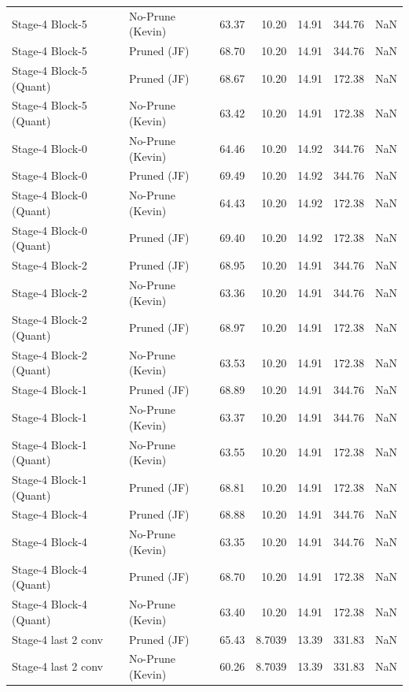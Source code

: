 \begin{table}
\begin{tabular}{llrrrrl}
Stage-4 Block-5 & No-Prune (Kevin) & 63.37 & 10.20 & 14.91 & 344.76 & NaN \\
Stage-4 Block-5 & Pruned (JF) & 68.70 & 10.20 & 14.91 & 344.76 & NaN \\
Stage-4 Block-5
(Quant) & Pruned (JF) & 68.67 & 10.20 & 14.91 & 172.38 & NaN \\
Stage-4 Block-5
(Quant) & No-Prune (Kevin) & 63.42 & 10.20 & 14.91 & 172.38 & NaN \\
Stage-4 Block-0 & No-Prune (Kevin) & 64.46 & 10.20 & 14.92 & 344.76 & NaN \\
Stage-4 Block-0 & Pruned (JF) & 69.49 & 10.20 & 14.92 & 344.76 & NaN \\
Stage-4 Block-0
(Quant) & No-Prune (Kevin) & 64.43 & 10.20 & 14.92 & 172.38 & NaN \\
Stage-4 Block-0
(Quant) & Pruned (JF) & 69.40 & 10.20 & 14.92 & 172.38 & NaN \\
Stage-4 Block-2 & Pruned (JF) & 68.95 & 10.20 & 14.91 & 344.76 & NaN \\
Stage-4 Block-2 & No-Prune (Kevin) & 63.36 & 10.20 & 14.91 & 344.76 & NaN \\
Stage-4 Block-2
(Quant) & Pruned (JF) & 68.97 & 10.20 & 14.91 & 172.38 & NaN \\
Stage-4 Block-2
(Quant) & No-Prune (Kevin) & 63.53 & 10.20 & 14.91 & 172.38 & NaN \\
Stage-4 Block-1 & Pruned (JF) & 68.89 & 10.20 & 14.91 & 344.76 & NaN \\
Stage-4 Block-1 & No-Prune (Kevin) & 63.37 & 10.20 & 14.91 & 344.76 & NaN \\
Stage-4 Block-1
(Quant) & No-Prune (Kevin) & 63.55 & 10.20 & 14.91 & 172.38 & NaN \\
Stage-4 Block-1
(Quant) & Pruned (JF) & 68.81 & 10.20 & 14.91 & 172.38 & NaN \\
Stage-4 Block-4 & Pruned (JF) & 68.88 & 10.20 & 14.91 & 344.76 & NaN \\
Stage-4 Block-4 & No-Prune (Kevin) & 63.35 & 10.20 & 14.91 & 344.76 & NaN \\
Stage-4 Block-4
(Quant) & Pruned (JF) & 68.70 & 10.20 & 14.91 & 172.38 & NaN \\
Stage-4 Block-4
(Quant) & No-Prune (Kevin) & 63.40 & 10.20 & 14.91 & 172.38 & NaN \\
Stage-4 last 2 conv & Pruned (JF) & 65.43 & 8.7039 & 13.39 & 331.83 & NaN \\
Stage-4 last 2 conv & No-Prune (Kevin) & 60.26 & 8.7039 & 13.39 & 331.83 & NaN \\

\end{tabular}
\end{table}
